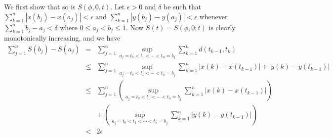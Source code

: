 \begin{enumerate}
\begin{thmproof}
We first show that so is \(S(\phi,0,t)\).
Let \(\epsilon>0\) and \(\delta\) be such that 
\(\sum_{k=1}^n |x(b_j) - x(a_j)| < \epsilon\) 
and
\(\sum_{k=1}^n |y(b_j) - y(a_j)| < \epsilon\) 
whenever \(\sum_{k=1}^n b_j - a_j < \delta\) where \(0 \leq a_j < b_j \leq 1\).
Now \(S(t) = S(\phi,0;t)\) is clearly monotonically increasing, 
and we have
\begin{eqnarray*}
\sum_{j=1}^n S(b_j) - S(a_j) 
&=&
\sum_{j=1}^n \sup_{a_j = t_0 < t_1 < \cdots < t_n = b_j} 
             \sum_{k=1}^n  d(t_{k-1},t_k) \\
&\leq&
\sum_{j=1}^n \sup_{a_j = t_0 < t_1 < \cdots < t_n = b_j} 
             \sum_{k=1}^n  |x(k) - x(t_{k-1})| + |y(k) - y(t_{k-1})|   \\
&\leq&
\sum_{j=1}^n 
\left(\sup_{a_j = t_0 < t_1 < \cdots < t_n = b_j} 
             \sum_{k=1}^n  |x(k) - x(t_{k-1})| \right) \\
&& +\;
\left(\sup_{a_j = t_0 < t_1 < \cdots < t_n = b_j} 
             \sum_{k=1}^n  |y(k) - y(t_{k-1})| \right)
\\
&<& 2\epsilon
\end{eqnarray*}


\end{thmproof}
\end{enumerate}

